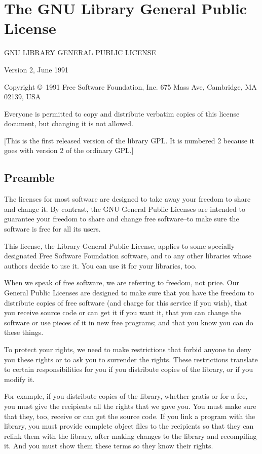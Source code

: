 \chapter{The GNU Library General Public License}\label{GNU-LGPL}

\centerline{GNU LIBRARY GENERAL PUBLIC LICENSE}
\centerline{Version 2, June 1991}

Copyright \copyright\ 1991 Free Software Foundation, Inc.
675 Mass Ave, Cambridge, MA 02139, USA

Everyone is permitted to copy and distribute verbatim copies
of this license document, but changing it is not allowed.

[This is the first released version of the library GPL\@.  It is
 numbered 2 because it goes with version 2 of the ordinary GPL.]

\section*{Preamble}

  The licenses for most software are designed to take away your
freedom to share and change it.  By contrast, the GNU General Public
Licenses are intended to guarantee your freedom to share and change
free software--to make sure the software is free for all its users.

  This license, the Library General Public License, applies to some
specially designated Free Software Foundation software, and to any
other libraries whose authors decide to use it.  You can use it for
your libraries, too.

  When we speak of free software, we are referring to freedom, not
price.  Our General Public Licenses are designed to make sure that you
have the freedom to distribute copies of free software (and charge for
this service if you wish), that you receive source code or can get it
if you want it, that you can change the software or use pieces of it
in new free programs; and that you know you can do these things.

  To protect your rights, we need to make restrictions that forbid
anyone to deny you these rights or to ask you to surrender the rights.
These restrictions translate to certain responsibilities for you if
you distribute copies of the library, or if you modify it.

  For example, if you distribute copies of the library, whether gratis
or for a fee, you must give the recipients all the rights that we gave
you.  You must make sure that they, too, receive or can get the source
code.  If you link a program with the library, you must provide
complete object files to the recipients so that they can relink them
with the library, after making changes to the library and recompiling
it.  And you must show them these terms so they know their rights.

